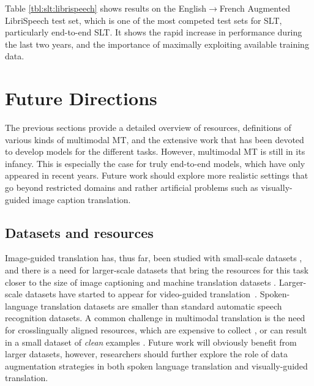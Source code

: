 \documentclass{svjour3}
\newcommand{\lp}[2]{#1$\rightarrow$#2}
\begin{document}
Table \ref{tbl:slt:librispeech} shows results on the \lp{English}{French} Augmented LibriSpeech test set, which is one of the most competed test sets for SLT, particularly end-to-end SLT. It shows the rapid increase in performance during the last two years, and the importance of maximally exploiting available training data.

     




\section{Future Directions}
\label{sec:future}
The previous sections provide a detailed overview of resources, definitions of various kinds of multimodal MT, and the extensive work that has been devoted to develop models for the different tasks. However, multimodal MT 
is still in its infancy. This is especially the case for truly end-to-end models, which have only appeared in recent years. Future work should explore more realistic settings that go beyond restricted domains and rather artificial problems such as visually-guided image caption translation.

\subsection{Datasets and resources}

Image-guided translation has, thus far, been studied with small-scale datasets \citep{elliott-multi30k:-2016}, and there is a need for larger-scale datasets that bring the resources for this task closer to the size of image captioning \citep{chen-microsoft-2015} and machine translation datasets \citep{tiedemann-parallel-2016}. Larger-scale datasets have started to appear for video-guided translation~\citep{sanabria-how2:-2018,wang-vatex-2019}. Spoken-language translation datasets \citep{kocabiyikoglu-librispeech-slt-2018, niehues-iwslt-2018} are smaller than standard automatic speech recognition datasets. A common challenge in multimodal translation is the need for crosslingually aligned resources, which are expensive to collect \citep{elliott-multi30k:-2016}, or can result in a small dataset of \textit{clean} examples \citep{kocabiyikoglu-librispeech-slt-2018}. Future work will obviously benefit from larger datasets, however, researchers should further explore the role of data augmentation strategies \citep{jia2019leveraging} in both spoken language translation and visually-guided translation.
\end{document}
